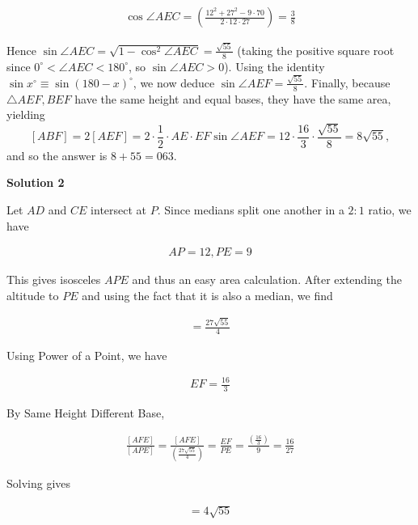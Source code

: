 \begin{enumerate}
 
 \begin{align*} \cos \angle AEC = \left(\frac{12^2 + 27^2 - 9 \cdot 70}{2 \cdot 12 \cdot 27}\right) = \frac{3}{8} \end{align*}


 

 Hence $\sin \angle AEC = \sqrt{1 - \cos^2 \angle AEC} = \frac{\sqrt{55}}{8}$ (taking the positive square root since $0^{\circ} < \angle AEC < 180^{\circ}$, so $\sin\angle AEC > 0$). Using the identity $\sin x^{\circ} \equiv \sin\left(180-x\right)^{\circ}$, we now deduce $\sin \angle AEF = \frac{\sqrt{55}}{8}$. Finally, because $\triangle AEF, BEF$ have the same height and equal bases, they have the same area, yielding 
 \[[ABF] = 2[AEF] = 2 \cdot \frac 12 \cdot AE \cdot EF \sin \angle AEF = 12 \cdot \frac{16}{3} \cdot \frac{\sqrt{55}}{8} = 8\sqrt{55},\] and so the answer is $8 + 55 = \boxed{063}$.

 



\textbf{Solution 2}

Let $AD$ and $CE$ intersect at $P$. Since medians split one another in a $2:1$ ratio, we have

 
 \begin{align*} AP = 12, PE = 9 \end{align*}


 

 This gives isosceles $APE$ and thus an easy area calculation. After extending the altitude to $PE$ and using the fact that it is also a median, we find

 
 \begin{align*} [APE] = \frac{27\sqrt{55}}{4} \end{align*}


 

 Using Power of a Point, we have

 
 \begin{align*} EF=\frac{16}{3} \end{align*}


 

 By Same Height Different Base,

 
 \begin{align*} \frac{[AFE]}{[APE]}=\frac{[AFE]}{(\frac{27\sqrt{55}}{4})}=\frac{EF}{PE}=\frac{(\frac{16}{3})}{9}=\frac{16}{27} \end{align*}


 

 Solving gives

 
 \begin{align*} [AFE] = 4\sqrt{55} \end{align*}



\end{enumerate}
